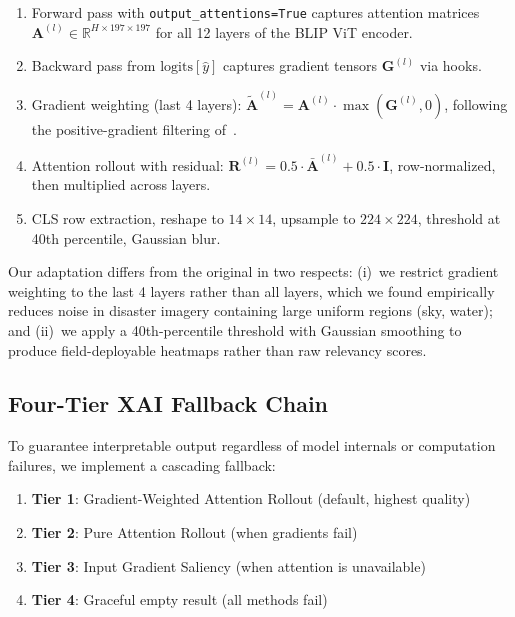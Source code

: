 \documentclass[journal]{IEEEtran}
\begin{document}
\begin{enumerate}
    \item Forward pass with \texttt{output\_attentions=True} captures attention matrices $\mathbf{A}^{(l)} \in \mathbb{R}^{H \times 197 \times 197}$ for all 12 layers of the BLIP ViT encoder.
    \item Backward pass from $\text{logits}[\hat{y}]$ captures gradient tensors $\mathbf{G}^{(l)}$ via hooks.
    \item Gradient weighting (last 4 layers): $\tilde{\mathbf{A}}^{(l)} = \mathbf{A}^{(l)} \cdot \max(\mathbf{G}^{(l)}, 0)$, following the positive-gradient filtering of~\cite{chefer2021transformer}.
    \item Attention rollout with residual: $\mathbf{R}^{(l)} = 0.5 \cdot \bar{\mathbf{A}}^{(l)} + 0.5 \cdot \mathbf{I}$, row-normalized, then multiplied across layers.
    \item CLS row extraction, reshape to $14 \times 14$, upsample to $224 \times 224$, threshold at 40th percentile, Gaussian blur.
\end{enumerate}

Our adaptation differs from the original in two respects: (i)~we restrict gradient weighting to the last 4 layers rather than all layers, which we found empirically reduces noise in disaster imagery containing large uniform regions (sky, water); and (ii)~we apply a 40th-percentile threshold with Gaussian smoothing to produce field-deployable heatmaps rather than raw relevancy scores.

\subsection{Four-Tier XAI Fallback Chain}

To guarantee interpretable output regardless of model internals or computation failures, we implement a cascading fallback:

\begin{enumerate}
    \item \textbf{Tier 1}: Gradient-Weighted Attention Rollout (default, highest quality)
    \item \textbf{Tier 2}: Pure Attention Rollout (when gradients fail)
    \item \textbf{Tier 3}: Input Gradient Saliency (when attention is unavailable)
    \item \textbf{Tier 4}: Graceful empty result (all methods fail)
\end{enumerate}
\end{document}
